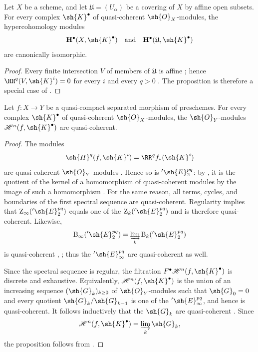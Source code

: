 \begin{proposition}[6.2.2]
\label{III.6.2.2}
Let $X$ be a scheme, and let $\mathfrak{U}=(U_\alpha)$ be a
covering of $X$ by affine open subsets.  For every complex
$\sh{K}^\bullet$ of quasi-coherent $\sh{O}_X$-modules, the
hypercohomology modules
\[
  \mathbf{H}^\bullet(X,\sh{K}^\bullet)
  \quad\text{and}\quad
  \mathbf{H}^\bullet(\mathfrak{U},\sh{K}^\bullet)
\]
are canonically isomorphic.
\end{proposition}

\begin{proof}
Every finite intersection $V$ of members of $\mathfrak{U}$ is
affine ; hence
$\HH^q(V,\sh{K}^i)=0$ for every $i$ and every $q>0$
.  The proposition is therefore a special case of
.
\end{proof}

\begin{proposition}[6.2.3]
\label{III.6.2.3}
Let $f:X\to Y$ be a quasi-compact separated morphism of
preschemes.  For every complex $\sh{K}^\bullet$ of quasi-coherent
$\sh{O}_X$-modules, the $\sh{O}_Y$-modules
$\mathcal{H}^n(f,\sh{K}^\bullet)$ are quasi-coherent.
\end{proposition}

\begin{proof}
The modules
\[
  \sh{H}^q(f,\sh{K}^i)=\RR^qf_*(\sh{K}^i)
\]
are quasi-coherent $\sh{O}_Y$-modules .  Hence so
is $'\sh{E}_2^{pq}$: by , it is the quotient of
the kernel of a homomorphism of quasi-coherent modules by the image
of such a homomorphism .  For the same reason, all
terms, cycles, and boundaries of the first spectral sequence are
quasi-coherent.  Regularity implies that
$\mathrm{Z}_\infty('\sh{E}_2^{pq})$ equals one of the
$\mathrm{Z}_k('\sh{E}_2^{pq})$ and is therefore quasi-coherent.
Likewise,
\[
  \mathrm{B}_\infty('\sh{E}_2^{pq})
  =
  \varinjlim_k\mathrm{B}_k('\sh{E}_2^{pq})
\]
is quasi-coherent , ; thus the
$'\sh{E}_\infty^{pq}$ are quasi-coherent as well.

Since the spectral sequence is regular, the filtration
$F^\bullet\mathcal{H}^n(f,\sh{K}^\bullet)$ is discrete and
exhaustive.  Equivalently,
$\mathcal{H}^n(f,\sh{K}^\bullet)$ is the union of an increasing
sequence $(\sh{G}_k)_{k\geq0}$ of $\sh{O}_Y$-modules such that
$\sh{G}_0=0$ and every quotient
$\sh{G}_k/\sh{G}_{k-1}$ is one of the
$'\sh{E}_\infty^{pq}$, and hence is quasi-coherent.  It follows
inductively that the $\sh{G}_k$ are quasi-coherent
.  Since
\[
  \mathcal{H}^n(f,\sh{K}^\bullet)
  =
  \varinjlim_k\sh{G}_k,
\]
the proposition follows from .
\end{proof}

